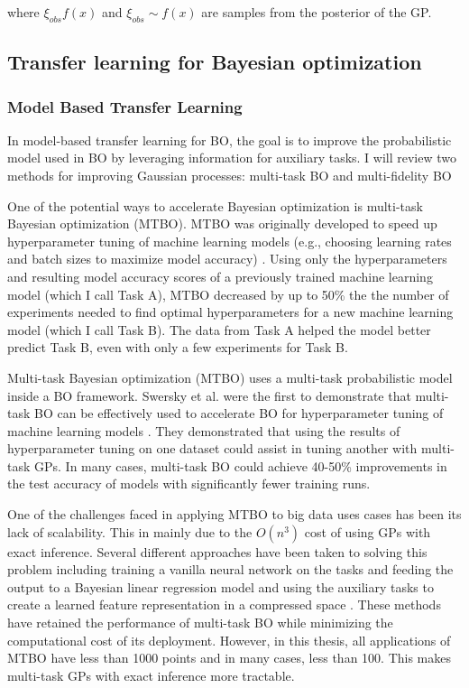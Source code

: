 where $\xi_{obs} f(x)$ and $\xi_{obs}\sim f(x)$ are samples from the posterior of the GP.

\subsection{Transfer learning for Bayesian optimization}

\subsubsection{Model Based Transfer Learning}

In model-based transfer learning for BO, the goal is to improve the probabilistic model used in BO by leveraging information for auxiliary tasks. I will review two methods for improving  Gaussian processes: multi-task BO and multi-fidelity BO

One of the potential ways to accelerate Bayesian optimization is multi-task Bayesian optimization (MTBO). MTBO was originally developed to speed up hyperparameter tuning of machine learning models (e.g., choosing learning rates and batch sizes to maximize model accuracy) \cite{Swersky2013}. Using only the hyperparameters and resulting model accuracy scores of a previously trained machine learning model (which I call Task A),  MTBO decreased by up to 50\% the the number of experiments needed to find optimal hyperparameters for a new machine learning model (which I call Task B).  The data from Task A helped the model better predict Task B, even with only a few experiments for Task B.

Multi-task Bayesian optimization (MTBO) uses a multi-task probabilistic model inside a BO framework.  Swersky et al. were the first to demonstrate that multi-task BO can be effectively used to accelerate BO for hyperparameter tuning of machine learning models \cite{Swersky2013}. They demonstrated that using the results of hyperparameter tuning on one dataset could assist in tuning another with multi-task GPs. In many cases, multi-task BO could achieve 40-50\% improvements in the test accuracy of models with significantly fewer training runs.  

One of the challenges faced in applying MTBO to big data uses cases has been its lack of scalability. This in mainly due to the $O(n^3)$ cost of using GPs with exact inference. Several different approaches have been taken to solving this problem including training a vanilla neural network on the tasks and feeding the output to a Bayesian linear regression model \cite{Perrone2018} and using the auxiliary tasks to create a learned feature representation in a compressed space \cite{Hakhamaneshi2021}. These methods have retained the performance of multi-task BO while minimizing the computational cost of its deployment. However, in this thesis, all applications of MTBO have less than 1000 points and in many cases, less than 100. This makes multi-task GPs with exact inference more tractable.

